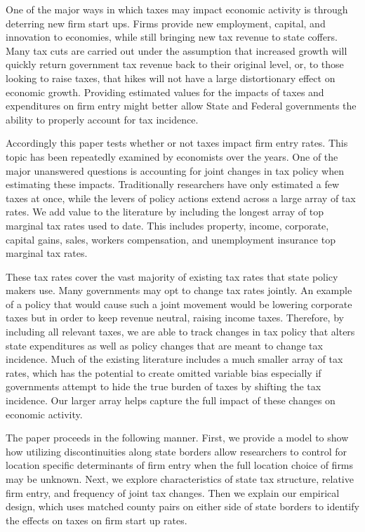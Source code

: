 \documentclass[12pt,a4paper]{article}
\begin{document}
One of the major ways in which taxes may impact economic activity is through deterring new firm start ups. Firms provide new employment, capital, and innovation to economies, while still bringing new tax revenue to state coffers. Many tax cuts are carried out under the assumption that increased growth will quickly return government tax revenue back to their original level, or, to those looking to raise taxes, that hikes will not have a large distortionary effect on economic growth. Providing estimated values for the impacts of taxes and expenditures on firm entry might better allow State and Federal governments the ability to properly account for tax incidence.

Accordingly this paper tests whether or not taxes impact firm entry rates. This topic has been repeatedly examined by economists over the years. One of the major unanswered questions is accounting for joint changes in tax policy when estimating these impacts. Traditionally researchers have only estimated a few taxes at once, while the levers of policy actions extend across a large array of tax rates. We add value to the literature by including the longest array of top marginal tax rates used to date. This includes property, income, corporate, capital gains, sales, workers compensation, and unemployment insurance top marginal tax rates.

These tax rates cover the vast majority of existing tax rates that state policy makers use. Many governments may opt to change tax rates jointly. An example of a policy that would cause such a joint movement would be lowering corporate taxes but in order to keep revenue neutral, raising income taxes. Therefore, by including all relevant taxes, we are able to track changes in tax policy that alters state expenditures as well as policy changes that are meant to change tax incidence. Much of the existing literature includes a much smaller array of tax rates, which has the potential to create omitted variable bias especially if governments attempt to hide the true burden of taxes by shifting the tax incidence. Our larger array helps capture the full impact of these changes on economic activity.

The paper proceeds in the following manner. First, we provide a model to show how utilizing discontinuities along state borders allow researchers to control for location specific determinants of firm entry when the full location choice of firms may be unknown. Next, we explore characteristics of state tax structure, relative firm entry, and frequency of joint tax changes. Then we explain our empirical design, which uses matched county pairs on either side of state borders to identify the effects on taxes on firm start up rates.
\end{document}
